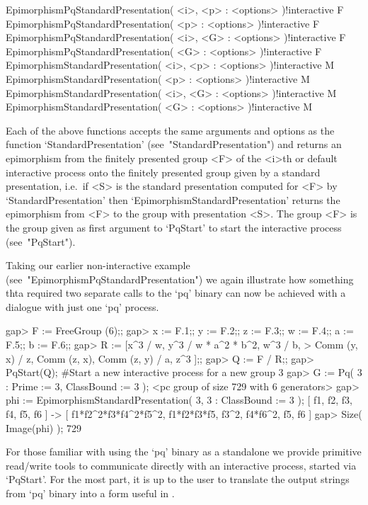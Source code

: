 \>EpimorphismPqStandardPresentation( <i>, <p> : <options> )!{interactive} F
\>EpimorphismPqStandardPresentation( <p> : <options> )!{interactive} F
\>EpimorphismPqStandardPresentation( <i>, <G> : <options> )!{interactive} F
\>EpimorphismPqStandardPresentation( <G> : <options> )!{interactive} F
\>EpimorphismStandardPresentation( <i>, <p> : <options> )!{interactive} M
\>EpimorphismStandardPresentation( <p> : <options> )!{interactive} M
\>EpimorphismStandardPresentation( <i>, <G> : <options> )!{interactive} M
\>EpimorphismStandardPresentation( <G> : <options> )!{interactive} M

Each of the above functions accepts the same arguments and options as the
function `StandardPresentation' (see~"StandardPresentation") and  returns
an epimorphism from the finitely presented group  <F>  of  the  <i>th  or
default interactive {\ANUPQ} process onto the  finitely  presented  group
given  by  a  standard  presentation,  i.e.~if  <S>   is   the   standard
presentation   computed   for   <F>   by   `StandardPresentation'    then
`EpimorphismStandardPresentation' returns the epimorphism from <F> to the
group with presentation <S>. The group <F> is the group  given  as  first
argument  to  `PqStart'  to  start  the  interactive   {\ANUPQ}   process
(see~"PqStart").

Taking        our         earlier         non-interactive         example
(see~"EpimorphismPqStandardPresentation")   we   again   illustrate   how
something thta required two separate calls to the `pq' binary can now  be
achieved with a dialogue with just one `pq' process.

\beginexample
gap> F := FreeGroup (6);;
gap> x := F.1;; y := F.2;; z := F.3;; w := F.4;; a := F.5;; b := F.6;;
gap> R := [x^3 / w, y^3 / w * a^2 * b^2, w^3 / b,
>          Comm (y, x) / z, Comm (z, x), Comm (z, y) / a, z^3 ];;
gap> Q := F / R;;
gap> PqStart(Q); #Start a new interactive process for a new group       
3
gap> G := Pq( 3 : Prime := 3, ClassBound := 3 );
<pc group of size 729 with 6 generators>
gap> phi := EpimorphismStandardPresentation( 3, 3 : ClassBound := 3 );
[ f1, f2, f3, f4, f5, f6 ] -> [ f1*f2^2*f3*f4^2*f5^2, f1*f2*f3*f5, f3^2, 
  f4*f6^2, f5, f6 ]
gap> Size( Image(phi) );
729
\endexample


For those familiar with using the `pq' binary as a standalone we  provide
primitive read/write tools to communicate directly  with  an  interactive
{\ANUPQ} process, started via `PqStart'. For the most part, it is  up  to
the user to translate the output strings from `pq'  binary  into  a  form
useful in {\GAP}.

